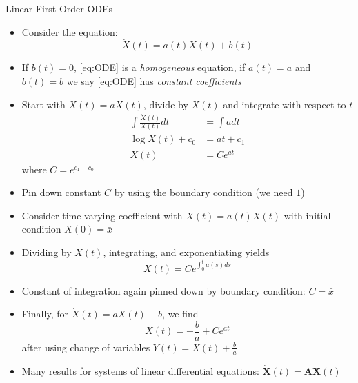 \documentclass[10pt]{beamer}
\begin{document}
\begin{frame}{Linear First-Order ODEs}
\begin{itemize}
\item Consider the equation:
\begin{equation}\label{eq:ODE}
	\dot X(t) = a(t) X(t) + b(t)
\end{equation}

\item If $b(t) = 0$, \eqref{eq:ODE} is a \textit{homogeneous} equation, if $a(t) = a$ and $b(t) = b$ we say \eqref{eq:ODE} has \textit{constant coefficients}

\item Start with $\dot X(t) = a X(t)$, divide by $X(t)$ and integrate with respect to $t$
\begin{align*}
	\int \frac{\dot X(t)}{X(t)} dt &= \int a dt \\
	\log X(t) + c_0 &= a t + c_1 \\
	X(t) &= C e^{a t}
\end{align*}
where $C = e^{c_1 - c_0}$

\item Pin down constant $C$ by using the boundary condition (we need $1$)
\end{itemize}
\end{frame}



\begin{frame}{}
\begin{itemize}
\item Consider time-varying coefficient with $\dot X(t) = a(t) X(t)$ with initial condition $X(0) = \bar x$

\item Dividing by $X(t)$, integrating, and exponentiating yields 
\begin{equation*}
	X(t) = C e^{ \int_0^t a(s) ds }
\end{equation*}

\item Constant of integration again pinned down by boundary condition: $C = \bar x$

\item Finally, for $\dot X(t) = a X(t) + b$, we find
\begin{equation*}
	X(t) = - \frac{b}{a} + C e^{at}
\end{equation*}
after using change of variables $Y(t) = X(t) + \frac{b}{a}$

\item Many results for systems of linear differential equations: $\dot{\bm X}(t) = \bm A \bm X(t)$

\end{itemize}
\end{frame}
\end{document}
